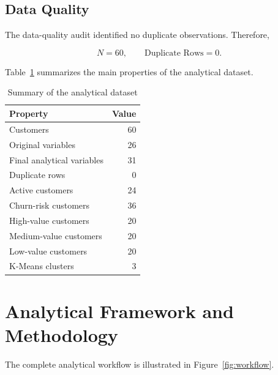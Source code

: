 \documentclass[11pt,a4paper]{article}
\begin{document}
\subsection{Data Quality}

The data-quality audit identified no duplicate observations. Therefore,

\[
N=60,
\qquad
\text{Duplicate Rows}=0.
\]

Table~\ref{tab:dataset_summary} summarizes the main properties of the analytical dataset.

\begin{table}[H]
\centering
\caption{Summary of the analytical dataset}
\label{tab:dataset_summary}
\begin{tabular}{lr}
\toprule
\textbf{Property} & \textbf{Value}\\
\midrule
Customers & 60\\
Original variables & 26\\
Final analytical variables & 31\\
Duplicate rows & 0\\
Active customers & 24\\
Churn-risk customers & 36\\
High-value customers & 20\\
Medium-value customers & 20\\
Low-value customers & 20\\
K-Means clusters & 3\\
\bottomrule
\end{tabular}
\end{table}


\section{Analytical Framework and Methodology}

The complete analytical workflow is illustrated in Figure~\ref{fig:workflow}.
\end{document}
